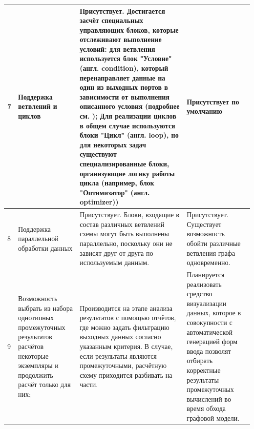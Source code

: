 \begin{landscape}
\begin{longtable}{|p{}|p{}|p{}|p{}|}
    \hline
    7          & Поддержка ветвлений и циклов                                                                                                         & Присутствует. Достигается засчёт специальных управляющих блоков, которые отслеживают выполнение условий: для ветвления используется блок "Условие" (англ. condition), который перенаправляет данные на один из выходных портов в зависимости от выполнения описанного условия (подробнее см. \cite{pSevenDocsConditons2022}); Для реализации циклов в общем случае используются блоки "Цикл" (англ. loop)\cite{pSevenDocsWorkflow2021}, но для некоторых задач существуют специализированные блоки, организующие логику работы цикла (например, блок "Оптимизатор" (англ. optimizer)) & Присутствует по умолчанию                                                                                                                                                                                                                                                                                       \\
    \hline
    8          & Поддержка параллельной обработки данных                                                                                              & Присутствует. Блоки, входящие в состав различных ветвлений схемы могут быть выполнены параллельно, поскольку они не зависят друг от друга по используемым данным.                                                                                                                                                                                                                                                                                                                                                                                                                     & Присутствует. Существует возможность обойти различные ветвления графа одновременно.                                                                                                                                                                                                                             \\
    \hline
    9          & Возможность выбрать из набора однотипных промежуточных результатов расчётов некоторые экземпляры и продолжить расчёт только для них; & Производится на этапе анализа результатов с помощью отчётов, где можно задать фильтрацию выходных данных согласно указанным критерия. В случае, если результаты являются промежуточными, расчётную схему приходится разбивать на части.                                                                                                                                                                                                                                                                                                                                               & Планируется реализовать средство визуализации данных, которое в совокупности с автоматической генерацией форм ввода\cite{SokolovPershin2017} позволят отбирать корректные результаты промежуточных вычислений во время обхода графовой модели.                                                                  \\

\end{longtable}
\end{landscape}
